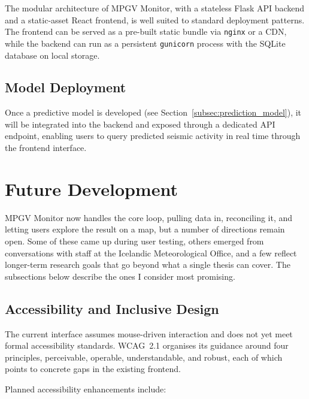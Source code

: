 \documentclass[12pt]{article}
\begin{document}
The modular architecture of MPGV Monitor, with a stateless Flask API backend and a static-asset React frontend, is well suited to standard deployment patterns. The frontend can be served as a pre-built static bundle via \texttt{nginx} or a CDN, while the backend can run as a persistent \texttt{gunicorn} process with the SQLite database on local storage.

\subsection{Model Deployment}
Once a predictive model is developed (see Section~\ref{subsec:prediction_model}), it will be integrated into the backend and exposed through a dedicated API endpoint, enabling users to query predicted seismic activity in real time through the frontend interface.

\section{Future Development}

MPGV Monitor now handles the core loop, pulling data in, reconciling it, and letting users explore the result on a map, but a number of directions remain open. Some of these came up during user testing, others emerged from conversations with staff at the Icelandic Meteorological Office, and a few reflect longer-term research goals that go beyond what a single thesis can cover. The subsections below describe the ones I consider most promising.

\subsection{Accessibility and Inclusive Design}

The current interface assumes mouse-driven interaction and does not yet meet formal accessibility standards. WCAG~2.1 \cite{WCAG21} organises its guidance around four principles, perceivable, operable, understandable, and robust, each of which points to concrete gaps in the existing frontend.

Planned accessibility enhancements include:
\end{document}
